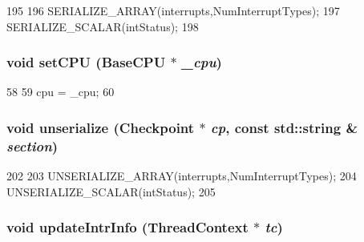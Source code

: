 \begin{DoxyCode}
195     {
196         SERIALIZE_ARRAY(interrupts,NumInterruptTypes);
197         SERIALIZE_SCALAR(intStatus);
198     }
\end{DoxyCode}
\hypertarget{classSparcISA_1_1Interrupts_a2ab8c6aed9969bc58d6aa2427d442cc4}{
\subsubsection[{setCPU}]{\setlength{\rightskip}{0pt plus 5cm}void setCPU ({\bf BaseCPU} $\ast$ {\em \_\-cpu})}}
\label{classSparcISA_1_1Interrupts_a2ab8c6aed9969bc58d6aa2427d442cc4}



\begin{DoxyCode}
58     {
59         cpu = _cpu;
60     }
\end{DoxyCode}
\hypertarget{classSparcISA_1_1Interrupts_af22e5d6d660b97db37003ac61ac4ee49}{
\subsubsection[{unserialize}]{\setlength{\rightskip}{0pt plus 5cm}void unserialize ({\bf Checkpoint} $\ast$ {\em cp}, \/  const std::string \& {\em section})}}
\label{classSparcISA_1_1Interrupts_af22e5d6d660b97db37003ac61ac4ee49}



\begin{DoxyCode}
202     {
203         UNSERIALIZE_ARRAY(interrupts,NumInterruptTypes);
204         UNSERIALIZE_SCALAR(intStatus);
205     }
\end{DoxyCode}
\hypertarget{classSparcISA_1_1Interrupts_a00892e9b06edcba6c3c27454d6235100}{
\subsubsection[{updateIntrInfo}]{\setlength{\rightskip}{0pt plus 5cm}void updateIntrInfo ({\bf ThreadContext} $\ast$ {\em tc})}}
\label{classSparcISA_1_1Interrupts_a00892e9b06edcba6c3c27454d6235100}



